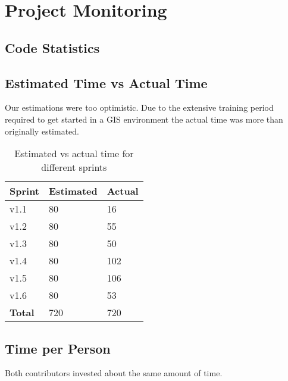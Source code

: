 \chapter{Project Monitoring}\label{project monitoring}

\section{Code Statistics}



\section{Estimated Time vs Actual Time}

Our estimations were too optimistic. Due to the extensive
training period required to get started in a GIS environment
the actual time was more than originally estimated.


\begin{table}[H]
\centering
    \begin{tabular}{lll}
    \textbf{Sprint}        & \textbf{Estimated} & \textbf{Actual} \\
     \hline
    v1.1  & 80     & 16        \\
    v1.2  & 80     & 55        \\
    v1.3  & 80     & 50        \\
    v1.4  & 80     & 102       \\
    v1.5  & 80     & 106         \\
    v1.6  & 80     & 53        \\
    \hline
    \textbf{Total} & 720 & 720 \\
    \end{tabular}
    \caption{Estimated vs actual time for different sprints}
\end{table}
\newpage

\section{Time per Person}

Both contributors invested about the same amount of time.

